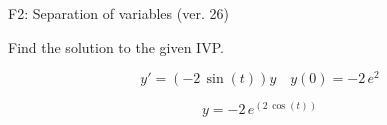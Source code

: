 \begin{exercise}
  \begin{exerciseTitle}F2: Separation of variables (ver. 26)\end{exerciseTitle}
  \begin{exerciseStatement}
    
Find the solution to the given IVP.

    
\[y'=( -2 \, \sin\left(t\right) )y\hspace{1em} y(0)= -2 \, e^{2}\]

  \end{exerciseStatement}
  \begin{exerciseAnswer}
    
\[y= -2 \, e^{\left(2 \, \cos\left(t\right)\right)}\]

  \end{exerciseAnswer}
\end{exercise}